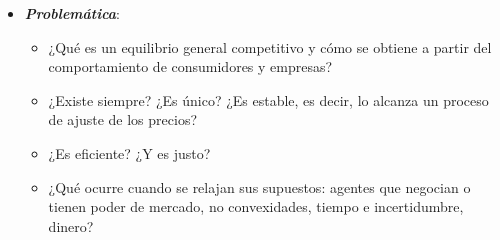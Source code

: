 \documentclass[11pt]{article}
\begin{document}
\begin{itemize}
\begin{itemize}
\begin{itemize}
\begin{itemize}
    \end{itemize}
  \item La teoría moderna nace en los años 50: \textcite{ArrowDebreu1954Existence} y \textcite{McKenzie1954Equilibrium} prueban la existencia con teoremas de punto fijo, y \textcite{Debreu1959Theory} la sistematiza axiomáticamente. Las condiciones marginales del óptimo las habían formulado \textcite{Lerner1934Economic} y \textcite{Lange1942Foundations}; la demostración moderna de los dos teoremas del bienestar se debe a \textcite{Arrow1951Extension} y \textcite{Debreu1951Coefficient}, por separado.
  \item En las décadas siguientes el programa se completa y encuentra sus límites:
    \begin{itemize}
    \item la estabilidad (,  y ,\footnote{ recibió el Premio Nobel de Economía en 2007, con  y , «por haber sentado las bases de la teoría del diseño de mecanismos»\nocite{Nobel2007HurwiczMaskinMyerson}.} 1959; , 1960);
    \item el núcleo ( y , 1963);
    \item el cálculo del equilibrio (, 1967);
    \item las economías regulares (, 1970);
    \item el teorema de -- (1972-1974);
    \item el equilibrio con mercados secuenciales (, 1972).
    \end{itemize}
  \end{itemize}
  \end{itemize}

\item \textbf{\emph{Problemática}}:
  \begin{itemize}
  \item ¿Qué es un equilibrio general competitivo y cómo se obtiene a partir del comportamiento de consumidores y empresas?
  \item ¿Existe siempre? ¿Es único? ¿Es estable, es decir, lo alcanza un proceso de ajuste de los precios?
  \item ¿Es eficiente? ¿Y es justo?
  \item ¿Qué ocurre cuando se relajan sus supuestos: agentes que negocian o tienen poder de mercado, no convexidades, tiempo e incertidumbre, dinero?
  \end{itemize}


\end{itemize}
\end{document}
